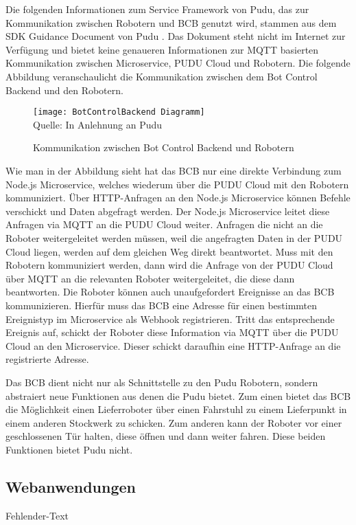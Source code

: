 Die folgenden Informationen zum Service Framework von Pudu, das zur Kommunikation zwischen Robotern und \ac{BCB} genutzt wird, stammen aus dem SDK Guidance Document von Pudu \cite{PuduSDK}. Das Dokument steht nicht im Internet zur Verfügung und bietet keine genaueren Informationen zur MQTT basierten Kommunikation zwischen Microservice, PUDU Cloud und Robotern. Die folgende Abbildung veranschaulicht die Kommunikation zwischen dem Bot Control Backend und den Robotern.

\begin{figure}[H]
\caption{Kommunikation zwischen Bot Control Backend und Robotern}
\texttt{[image: BotControlBackend Diagramm]}
\\
Quelle: In Anlehnung an Pudu \cite[S.~4]{PuduSDK}
\end{figure}

Wie man in der Abbildung sieht hat das \ac{BCB} nur eine direkte Verbindung zum Node.js Microservice, welches wiederum über die PUDU Cloud mit den Robotern kommuniziert. Über \gls{HTTP}-Anfragen an den Node.js Microservice können Befehle verschickt und Daten abgefragt werden. Der Node.js Microservice leitet diese Anfragen via \gls{MQTT} an die PUDU Cloud weiter. Anfragen die nicht an die Roboter weitergeleitet werden müssen, weil die angefragten Daten in der PUDU Cloud liegen, werden auf dem gleichen Weg direkt beantwortet. Muss mit den Robotern kommuniziert werden, dann wird die Anfrage von der PUDU Cloud über \gls{MQTT} an die relevanten Roboter weitergeleitet, die diese dann beantworten. Die Roboter können auch unaufgefordert Ereignisse an das \ac{BCB} kommunizieren. Hierfür muss das \ac{BCB} eine Adresse für einen bestimmten Ereignistyp im Microservice als \gls{Webhook} registrieren. Tritt das entsprechende Ereignis auf, schickt der Roboter diese Information via \gls{MQTT} über die PUDU Cloud an den Microservice. Dieser schickt daraufhin eine HTTP-Anfrage an die registrierte Adresse.

Das \ac{BCB} dient nicht nur als Schnittstelle zu den Pudu Robotern, sondern abstraiert neue Funktionen aus denen die Pudu bietet. Zum einen bietet das \ac{BCB} die Möglichkeit einen Lieferroboter über einen Fahrstuhl zu einem Lieferpunkt in einem anderen Stockwerk zu schicken. Zum anderen kann der Roboter vor einer geschlossenen Tür halten, diese öffnen und dann weiter fahren. Diese beiden Funktionen bietet Pudu nicht.

\subsection{Webanwendungen}
Fehlender-Text


